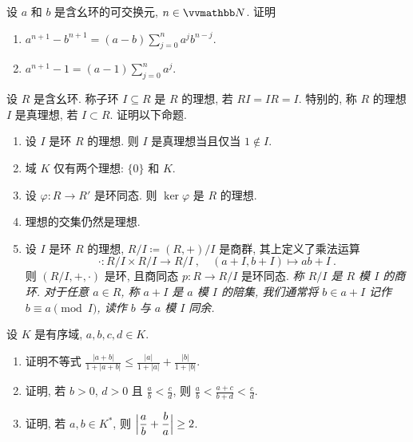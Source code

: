 \begin{exercise}\label{ex:difference-of-powers-formula}
    设 \(a\) 和 \(b\) 是含幺环的可交换元, \(n \in \N\). 证明
    \begin{enumerate}
        \item \(a^{n + 1} - b^{n + 1} = (a - b) \sum_{j = 0}^n a^j b^{n - j}\).
        \item \(a^{n + 1} - 1 = (a - 1) \sum_{j = 0}^n a^j\).
    \end{enumerate}
\end{exercise}

\begin{exercise}\label{ex:ideal}
    设 \(R\) 是含幺环. 称子环 \(I \subseteq R\) 是 \(R\) 的理想, 若 \(R I = I R = I\). 特别的, 称 \(R\) 的理想 \(I\) 是真理想, 若 \(I \subset R\). 证明以下命题.
    \begin{enumerate}
        \item 设 \(I\) 是环 \(R\) 的理想. 则 \(I\) 是真理想当且仅当 \(1 \notin I\).
        \item 域 \(K\) 仅有两个理想: \(\{0\}\) 和 \(K\).
        \item 设 \(\varphi \colon R \to R'\) 是环同态. 则 \(\ker \varphi\) 是 \(R\) 的理想.
        \item 理想的交集仍然是理想.
        \item 设 \(I\) 是环 \(R\) 的理想, \(R / I \coloneqq (R, +) / I\) 是商群, 其上定义了乘法运算
        \[
            \cdot \colon R / I \times R / I \to R / I\ ,\quad (a + I, b + I) \mapsto a b + I\ .
        \]
        则 \((R / I, +, \cdot)\) 是环, 且商同态 \(p \colon R \to R / I\) 是环同态. \textsl{称 \(R / I\) 是 \(R\) 模 \(I\) 的商环. 对于任意 \(a \in R\), 称 \(a + I\) 是 \(a\) 模 \(I\) 的陪集, 我们通常将 \(b \in a + I\) 记作 \(b \equiv a \pmod I\), 读作 \(b\) 与 \(a\) 模 \(I\) 同余.}
    \end{enumerate}
\end{exercise}

\begin{exercise}\label{ex:inequality-on-ordered-ﬁeld}
    设 \(K\) 是有序域, \(a, b, c, d \in K\).
    \begin{enumerate}
        \item 证明不等式 \(\displaystyle \frac{|a + b|}{1 + |a + b|} \leq \frac{|a|}{1 + |a|} + \frac{|b|}{1 + |b|}\).
        \item 证明, 若 \(b > 0\), \(d > 0\) 且 \(\displaystyle \frac{a}{b} < \frac{c}{d}\), 则 \(\displaystyle \frac{a}{b} < \frac{a + c}{b + d} < \frac{c}{d}\).
        \item 证明, 若 \(a, b \in K^\ast\), 则 \(\displaystyle \Bigl|\frac{a}{b} + \frac{b}{a}\Bigr| \geq 2\).
    \end{enumerate}
\end{exercise}

